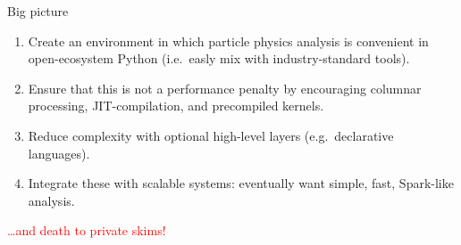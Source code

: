 \documentclass[aspectratio=169]{beamer}
\begin{document}
\begin{frame}{Big picture}
\vspace{0.4 cm}
\Large

\begin{enumerate}\setlength{\itemsep}{0.25 cm}
\item Create an environment in which particle physics analysis is convenient in open-ecosystem Python (i.e.\ easly mix with industry-standard tools).
\item Ensure that this is not a performance penalty by encouraging columnar processing, JIT-compilation, and precompiled kernels.
\item Reduce complexity with optional high-level layers (e.g.\ declarative languages).
\item Integrate these with scalable systems: eventually want simple, fast, Spark-like analysis.
\end{enumerate}

\begin{center}
\textcolor{red}{\ldots and death to private skims!}
\end{center}
\end{frame}
\end{document}
